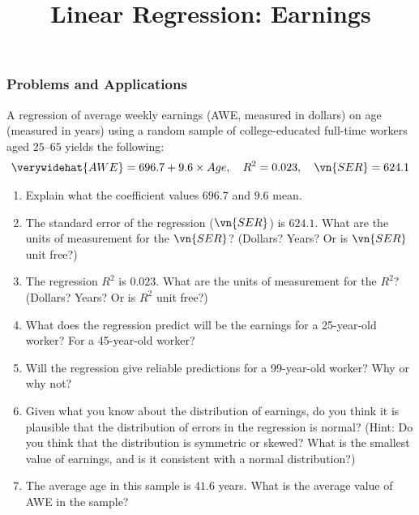 \title[Earnings]{Linear Regression: Earnings}
\date{}







\def\ask{\begin{align*}
\verywidehat{AWE} 
  = 696.7 + 9.6 \times Age,
  \quad R^2 = 0.023,
  \quad \vn{SER} = 624.1
\end{align*}\vspace*{-3ex}}


\begin{frame}
\frametitle{Problems and Applications}
A regression of average weekly earnings (AWE, measured in dollars) on age (measured in years) using a random sample of college-educated full-time workers aged $25$–$65$ yields the following:
\ask
\begin{enumerate}
\item Explain what the coefficient values $696.7$ and $9.6$ mean.
\item The standard error of the regression ($\vn{SER}$) is $624.1$. What are the units of measurement for the $\vn{SER}$? (Dollars? Years? Or is $\vn{SER}$ unit free?)
\item The regression $R^2$ is $0.023$. What are the units of measurement for the $R^2$? (Dollars? Years? Or is $R^2$ unit free?)
\item What does the regression predict will be the earnings for a 25-year-old worker? For a 45-year-old worker?
\item Will the regression give reliable predictions for a 99-year-old worker? Why or why not?
\item Given what you know about the distribution of earnings, do you think it is plausible that the distribution of errors in the regression is normal? (Hint: Do you think that the distribution is symmetric or skewed? What is the smallest value of earnings, and is it consistent with a normal distribution?)
\item The average age in this sample is $41.6$ years. What is the average value of AWE in the sample?
\end{enumerate}
\end{frame}



